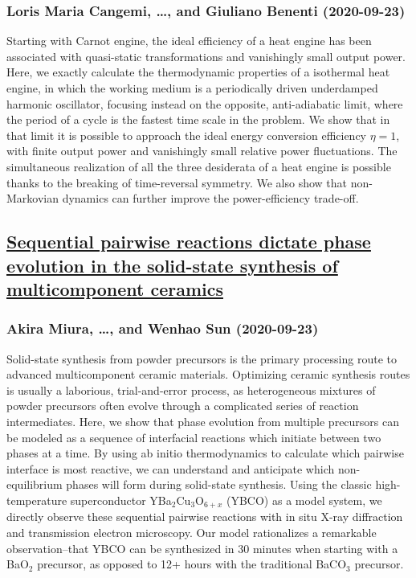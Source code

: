 {\subsubsection*{Loris Maria Cangemi, \dots, and Giuliano Benenti (2020-09-23)}
Starting with Carnot engine, the ideal efficiency of a heat engine has been
associated with quasi-static transformations and vanishingly small output
power. Here, we exactly calculate the thermodynamic properties of a isothermal
heat engine, in which the working medium is a periodically driven underdamped
harmonic oscillator, focusing instead on the opposite, anti-adiabatic limit,
where the period of a cycle is the fastest time scale in the problem. We show
that in that limit it is possible to approach the ideal energy conversion
efficiency $\eta=1$, with finite output power and vanishingly small relative
power fluctuations. The simultaneous realization of all the three desiderata of
a heat engine is possible thanks to the breaking of time-reversal symmetry. We
also show that non-Markovian dynamics can further improve the power-efficiency
trade-off.

\subsection*{\href{http://arxiv.org/abs/2009.10896v1}{Sequential pairwise reactions dictate phase evolution in the solid-state  synthesis of multicomponent ceramics}}
\subsubsection*{Akira Miura, \dots, and Wenhao Sun (2020-09-23)}
Solid-state synthesis from powder precursors is the primary processing route
to advanced multicomponent ceramic materials. Optimizing ceramic synthesis
routes is usually a laborious, trial-and-error process, as heterogeneous
mixtures of powder precursors often evolve through a complicated series of
reaction intermediates. Here, we show that phase evolution from multiple
precursors can be modeled as a sequence of interfacial reactions which initiate
between two phases at a time. By using ab initio thermodynamics to calculate
which pairwise interface is most reactive, we can understand and anticipate
which non-equilibrium phases will form during solid-state synthesis. Using the
classic high-temperature superconductor YBa$_2$Cu$_3$O$_{6+x}$ (YBCO) as a
model system, we directly observe these sequential pairwise reactions with in
situ X-ray diffraction and transmission electron microscopy. Our model
rationalizes a remarkable observation--that YBCO can be synthesized in 30
minutes when starting with a BaO$_2$ precursor, as opposed to 12+ hours with
the traditional BaCO$_3$ precursor.

}
